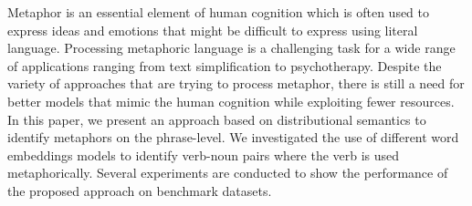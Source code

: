 Metaphor is an essential element of human cognition which is often used to express ideas and emotions that might be difficult to express using literal language. Processing metaphoric language is a challenging task for a wide range of applications ranging from text simplification to psychotherapy. Despite the variety of approaches that are trying to process metaphor, there is still a need for better models that mimic the human cognition while exploiting fewer resources. In this paper, we present an approach based on distributional semantics to identify metaphors on the phrase-level. We investigated the use of different word embeddings models to identify verb-noun pairs where the verb is used metaphorically. Several experiments are conducted to show the performance of the proposed approach on benchmark datasets.
